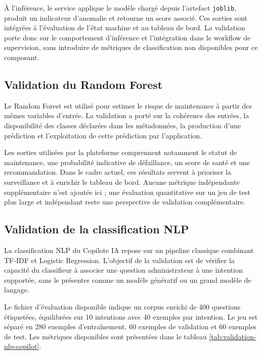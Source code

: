 À l'inférence, le service applique le modèle chargé depuis l'artefact \texttt{joblib}, produit un indicateur d'anomalie et retourne un score associé. Ces sorties sont intégrées à l'évaluation de l'état machine et au tableau de bord. La validation porte donc sur le comportement d'inférence et l'intégration dans le workflow de supervision, sans introduire de métriques de classification non disponibles pour ce composant.

\subsection{Validation du Random Forest}

Le Random Forest est utilisé pour estimer le risque de maintenance à partir des mêmes variables d'entrée. La validation a porté sur la cohérence des entrées, la disponibilité des classes déclarées dans les métadonnées, la production d'une prédiction et l'exploitation de cette prédiction par l'application.

Les sorties utilisées par la plateforme comprennent notamment le statut de maintenance, une probabilité indicative de défaillance, un score de santé et une recommandation. Dans le cadre actuel, ces résultats servent à prioriser la surveillance et à enrichir le tableau de bord. Aucune métrique indépendante supplémentaire n'est ajoutée ici ; une évaluation quantitative sur un jeu de test plus large et indépendant reste une perspective de validation complémentaire.

\subsection{Validation de la classification NLP}

La classification NLP du Copilote IA repose sur un pipeline classique combinant TF-IDF et Logistic Regression. L'objectif de la validation est de vérifier la capacité du classifieur à associer une question administrateur à une intention supportée, sans le présenter comme un modèle génératif ou un grand modèle de langage.

Le fichier d'évaluation disponible indique un corpus enrichi de 400 questions étiquetées, équilibrées sur 10 intentions avec 40 exemples par intention. Le jeu est séparé en 280 exemples d'entraînement, 60 exemples de validation et 60 exemples de test. Les métriques disponibles sont présentées dans le tableau \ref{tab:validation-nlp-copilot}.

